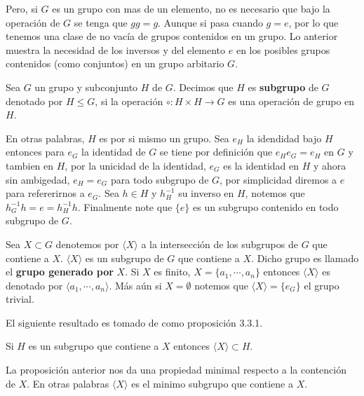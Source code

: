 Pero, si $G$ es un grupo con mas de un elemento, no es necesario que bajo la operación de $G$ se tenga que $gg=g$. Aunque si pasa cuando $g=e$, por lo que tenemos una clase de no vacía de grupos contenidos en un grupo. Lo anterior muestra la necesidad de los inversos y del elemento $e$ en los posibles grupos contenidos (como conjuntos) en un grupo arbitario $G$.

\begin{df}
Sea $G$ un grupo y subconjunto $H$ de $G$. Decimos que $H$ es \textbf{subgrupo} de $G$ denotado por $H \leq G$, si la operación $\circ:H \times H \to G$ es una operación de grupo en $H$.	
\end{df}

En otras palabras, $H$ es por si mismo un grupo. Sea $e_H$ la idendidad bajo $H$ entonces para $e_G$ la identidad de $G$ se tiene por definición que $e_H e_G=e_H$ en $G$ y tambien en $H$, por la unicidad de la identidad, $e_G$ es la identidad en $H$ y ahora sin ambigedad, $e_H=e_G$ para todo subgrupo de $G$, por simplicidad diremos a $e$ para refererirnos a $e_G$. Sea $h \in H$ y $h_H^{-1}$ su inverso en $H$, notemos que $h_G^{-1}h=e=h_H^{-1}h$. Finalmente note que $\{e\}$ es un subgrupo contenido en todo subgrupo de $G$. 
		
\begin{ob}
Sea $X \subset G$ denotemos por $\langle X \rangle$ a la intersección de los subgrupos de $G$ que contiene a $X$. $\langle X \rangle$ es un subgrupo de $G$ que contiene a $X$. Dicho grupo es llamado el \textbf{grupo generado por} $X$. Si $X$ es finito, $X=\{ a_1, \cdots , a_n\}$ entonces $\langle X \rangle$ es denotado por $\langle a_1, \cdots, a_n \rangle$. Más aún si $X=\emptyset$ notemos que $\langle X \rangle=\{e_G\}$ el grupo trivial.
\end{ob}

El siguiente resultado es tomado de \cite{alg_i} como proposición 3.3.1.

\begin{pr}
Si $H$ es un subgrupo que contiene a $X$ entonces $\langle X \rangle \subset H$.
\end{pr}

La proposición anterior nos da una propiedad minimal respecto a la contención de $X$. En otras palabras $\langle X \rangle$ es el minimo subgrupo que contiene a $X$.

